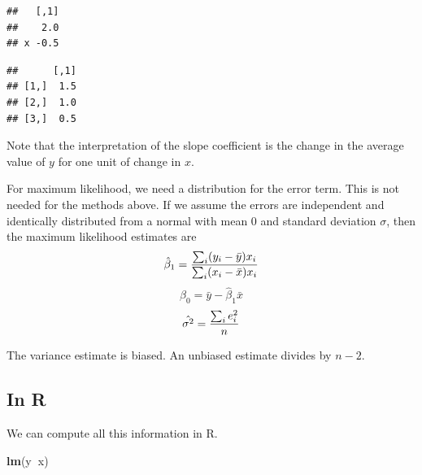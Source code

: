 \documentclass[]{book}
\newenvironment{Shaded}{\begin{snugshade}}{\end{snugshade}}
\newcommand{\KeywordTok}[1]{\textcolor[rgb]{0.13,0.29,0.53}{\textbf{#1}}}
\newcommand{\OperatorTok}[1]{\textcolor[rgb]{0.81,0.36,0.00}{\textbf{#1}}}
\newcommand{\NormalTok}[1]{#1}
\theoremstyle{definition}
\theoremstyle{definition}
\theoremstyle{definition}
\theoremstyle{remark}
\begin{document}
\begin{Shaded}
\end{Shaded}

\begin{verbatim}
##   [,1]
##    2.0
## x -0.5
\end{verbatim}

\begin{Shaded}
\end{Shaded}

\begin{verbatim}
##      [,1]
## [1,]  1.5
## [2,]  1.0
## [3,]  0.5
\end{verbatim}

Note that the interpretation of the slope coefficient is the change in
the average value of \(y\) for one unit of change in \(x\).

For maximum likelihood, we need a distribution for the error term. This
is not needed for the methods above. If we assume the errors are
independent and identically distributed from a normal with mean 0 and
standard deviation \(\sigma\), then the maximum likelihood estimates are
\[\hat{\beta}_{1}={\sum_{i} (y_{i}-\bar{y})x_{i} \over \sum_{i} (x_{i}-\bar{x})x_{i}}\]
\[\hat{\beta}_{0}=\bar{y}-\hat{\beta}_{1}\bar{x}\]
\[\hat{\sigma^{2}}={\sum_{i}e_{i}^2 \over n}\]

The variance estimate is biased. An unbiased estimate divides by
\(n-2\).

\subsection{In R}\label{in-r}

We can compute all this information in R.

\begin{Shaded}
\begin{Highlighting}[]
\KeywordTok{lm}\NormalTok{(y}\OperatorTok{~}\NormalTok{x)}
\end{Highlighting}
\end{Shaded}
\end{document}
